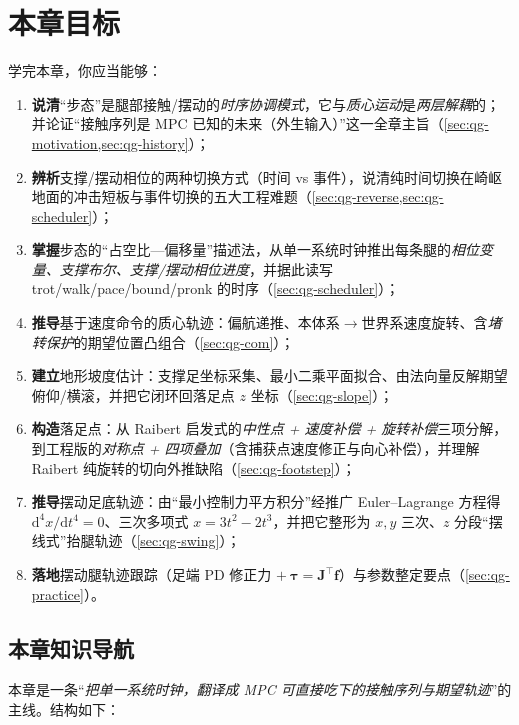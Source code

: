 \section*{本章目标}
学完本章，你应当能够：
\begin{enumerate}
  \item \textbf{说清}“步态”是腿部接触/摆动的\emph{时序协调模式}，它与\emph{质心运动}是\emph{两层解耦}的；并论证“接触序列是 MPC 已知的未来（外生输入）”这一全章主旨（\cref{sec:qg-motivation,sec:qg-history}）；
  \item \textbf{辨析}支撑/摆动相位的两种切换方式（时间 vs 事件），说清纯时间切换在崎岖地面的冲击短板与事件切换的五大工程难题（\cref{sec:qg-reverse,sec:qg-scheduler}）；
  \item \textbf{掌握}步态的“占空比—偏移量”描述法，从单一系统时钟推出每条腿的\emph{相位变量、支撑布尔、支撑/摆动相位进度}，并据此读写 trot/walk/pace/bound/pronk 的时序（\cref{sec:qg-scheduler}）；
  \item \textbf{推导}基于速度命令的质心轨迹：偏航递推、本体系$\to$世界系速度旋转、含\emph{堵转保护}的期望位置凸组合（\cref{sec:qg-com}）；
  \item \textbf{建立}地形坡度估计：支撑足坐标采集、最小二乘平面拟合、由法向量反解期望俯仰/横滚，并把它闭环回落足点 $z$ 坐标（\cref{sec:qg-slope}）；
  \item \textbf{构造}落足点：从 Raibert 启发式的\emph{中性点 + 速度补偿 + 旋转补偿}三项分解，到工程版的\emph{对称点 + 四项叠加}（含捕获点速度修正与向心补偿），并理解 Raibert 纯旋转的切向外推缺陷（\cref{sec:qg-footstep}）；
  \item \textbf{推导}摆动足底轨迹：由“最小控制力平方积分”经推广 Euler–Lagrange 方程得 $\mathrm{d}^4x/\mathrm{d}t^4=0$、三次多项式 $x=3t^2-2t^3$，并把它整形为 $x,y$ 三次、$z$ 分段“摆线式”抬腿轨迹（\cref{sec:qg-swing}）；
  \item \textbf{落地}摆动腿轨迹跟踪（足端 PD 修正力 $+\ \boldsymbol{\tau}=\mathbf{J}^\top\mathbf{f}$）与参数整定要点（\cref{sec:qg-practice}）。
\end{enumerate}

\subsection*{本章知识导航}
本章是一条“\emph{把单一系统时钟，翻译成 MPC 可直接吃下的接触序列与期望轨迹}”的主线。结构如下：

